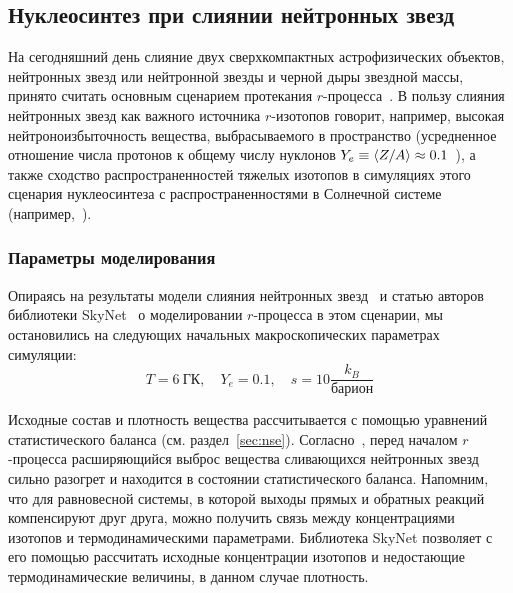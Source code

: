 \subsection{Нуклеосинтез при слиянии нейтронных звезд}
На сегодняшний день слияние двух сверхкомпактных астрофизических объектов, нейтронных звезд или нейтронной звезды и черной дыры звездной массы, принято считать основным сценарием протекания $r$-процесса~\cite{korobkin2012}. В пользу слияния нейтронных звезд как важного источника $r$-изотопов говорит, например, высокая нейтроноизбыточность вещества, выбрасываемого в пространство (усредненное отношение числа протонов к общему числу нуклонов $Y_e \equiv \expval{Z/A} \approx 0.1$~\cite{kajino2019}), а также сходство распространенностей тяжелых изотопов в симуляциях этого сценария нуклеосинтеза с распространенностями в Солнечной системе (например,~\cite{freiberghaus1999,goriely2011,korobkin2012}).

\subsubsection{}

\subsubsection{Параметры моделирования}
Опираясь на результаты модели слияния нейтронных звезд~\cite{korobkin2012} и статью авторов библиотеки SkyNet~\cite{lippuner2015} о моделировании $r$-процесса в этом сценарии, мы остановились на следующих начальных макроскопических параметрах симуляции:
\begin{equation}
\displaystyle
T = 6~\text{ГК},\quad Y_e = 0.1,\quad s = 10 \frac{k_B}{\text{барион}}
\end{equation}

Исходные состав и плотность вещества рассчитывается с помощью уравнений статистического баланса (см. раздел~\ref{sec:nse}). Согласно~\cite{goriely2011,korobkin2012,theilemann2017}, перед началом $r$-процесса расширяющийся выброс вещества сливающихся нейтронных звезд сильно разогрет и находится в состоянии статистического баланса. Напомним, что для равновесной системы, в которой выходы прямых и обратных реакций компенсируют друг друга, можно получить связь между концентрациями изотопов и термодинамическими параметрами. Библиотека SkyNet позволяет с его помощью рассчитать исходные концентрации изотопов и недостающие термодинамические величины, в данном случае плотность.

